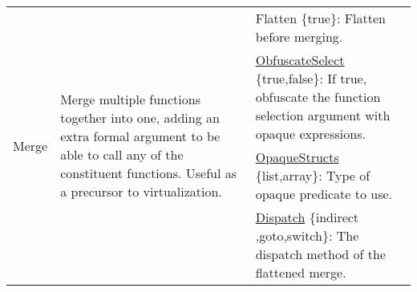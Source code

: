 \begin{table*}[p]
\begin{tabular}{|p{2.25cm}|p{4cm}|p{11cm}|}
\multirow{7}{*}{Merge}               & \multirow{7}{4cm}{Merge multiple functions together into one, adding an extra formal argument to be able to call any of the constituent functions. Useful as a precursor to virtualization.
}                                                                                                                                                                                                             & Flatten \{true\}: Flatten before merging.                                                                                                                                                                                                                                                                                                                \\ \cline{3-3} 
                                     &                                                                                                                                                                                                                                                                                                         & \underline{ObfuscateSelect} \{true,false\}: If true, obfuscate the function selection argument with opaque expressions.                                                                                                                                                                                                               \\ \cline{3-3} 
                                     &                                                                                                                                                                                                                                                                                                         & \underline{OpaqueStructs} \{list,array\}: Type of opaque predicate to use.                                                                                                                                                                                                                                                       \\ \cline{3-3} 
                                     &                                                                                                                                                                                                                                                                                                         & \underline{Dispatch} \{indirect ,goto,switch\}: The dispatch method of the flattened merge.                                                                                                                       \\ \cline{3-3} 

\end{tabular}
\end{table*}
